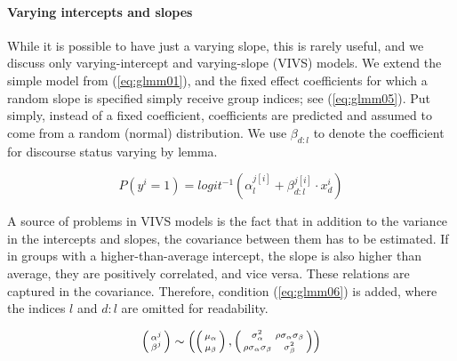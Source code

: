 \documentclass[a4paper,12pt]{article}
\begin{document}

\paragraph{Varying intercepts and slopes}

While it is possible to have just a varying slope, this is rarely useful, and we discuss only varying-intercept and varying-slope (VIVS) models.
We extend the simple model from (\ref{eq:glmm01}), and the fixed effect coefficients for which a random slope is specified simply receive group indices; see (\ref{eq:glmm05}).
Put simply, instead of a fixed coefficient, coefficients are predicted and assumed to come from a random (normal) distribution.
We use $\beta_{d:l}$ to denote the coefficient for discourse status varying by lemma.

\begin{equation}
  P(y^i=1)=logit^{-1}(\alpha_{l}^{j[i]}+\beta_{d:l}^{j[i]}\cdot x_d^i)
  \label{eq:glmm05}
\end{equation}

A source of problems in VIVS models is the fact that in addition to the variance in the intercepts and slopes, the covariance between them has to be estimated.
If in groups with a higher-than-average intercept, the slope is also higher than average, they are positively correlated, and vice versa.
These relations are captured in the covariance.
Therefore, condition (\ref{eq:glmm06}) is added, where the indices $l$ and $d:l$ are omitted for readability.

\begin{equation} 
  \left( \begin{smallmatrix} \alpha^j \\ \beta^j \end{smallmatrix}\right) \sim
    \left(
    \left( \begin{smallmatrix} \mu_{\alpha}\vphantom{\beta^j} \\ \mu_{\beta}\vphantom{\beta^j} \end{smallmatrix} \right), 
      \left( \begin{smallmatrix} \sigma_{\alpha}^2 & \rho\sigma_{\alpha}\sigma_{\beta} \\
	\rho\sigma_{\alpha}\sigma_{\beta} & \sigma_{\beta}^2 \end{smallmatrix} \right)
    \right)
  \label{eq:glmm06}
\end{equation}
\end{document}
